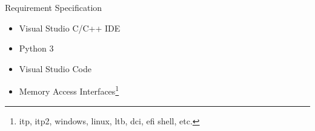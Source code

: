 \begin{frame}{Requirement Specification}
    \begin{itemize}
        \item Visual Studio C/C++ IDE
        \item Python 3
        \item Visual Studio Code
        \item Memory Access Interfaces\footnote{itp, itp2, windows, linux, ltb, dci, efi shell, etc.}
    \end{itemize}
\end{frame}